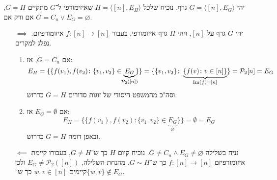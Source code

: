 \documentclass[]{article}
\newcommand\ps    {\mathcal{P}}
\newcommand\ra    {\rangle}
\newcommand\la    {\langle}
\newcommand\Img   {\mathrm{Im}}
\begin{document}
	\section{}
	יהי $G = \la [n], E_G \ra$ גרף. נוכיח שלכל $H = \la [n], E_H \ra$ שאיזימורפי ל־$G$ מתקיים $G = H$, אם ורק אם $G = C_n \lor E_G = \varnothing$. 
	\begin{itemize}
		\item[$\implies$]יהי $G$ גרף על $[n]$, ויהי $H$ גרף איזומורפי, בעבור $f \colon [n] \to [n]$ איזומורפיזם. נפלג למקרים. 
		\begin{enumerate}
			\item אם $G = C_n$, אז:
			\[ E_H = \{\{f(v_1), f(v_2) \colon \{v_1, v_2\} \in \underbrace{E_G}_{\mathclap{\ps_2([n])}}\}\} = \{\{v_1, v_2\} \colon \underbrace{\{f(v) \colon v \in [n] \}}_{\Img(f) = [n]}\} = \ps_2[n] = E_G \]
			וסה"כ מהמשפט היסודי של זוגות סדורים $G = H$ כדרוש. 
			\item אם $E_G = \emptyset$ אז: 
			\[ E_H = \{\{f(v_1), f(v_2) \colon \{v_1, v_2\} \in \underbrace{E_G}_{\varnothing}\}\} = \emptyset = E_G \]
			ובאפן דומה $G = H$ כדרוש. 
		\end{enumerate}
		\item[$\impliedby$]נניח בשלילה $G \neq C_n \land E_G \neq \varnothing$. נוכיח קיום $H$ כך ש־$G \neq H$, בעבורו קיימת איזומורפיזם $f \colon [n] \to [n]$ כך ש־$G \sim H$. מהנחת השלילה, $E_G \neq \ps_2([n])$ ולכן קיימים $w, v \in [n]$ כך ש־$\{w, v\} \notin E_G$. 
	\end{itemize}
\end{document}

